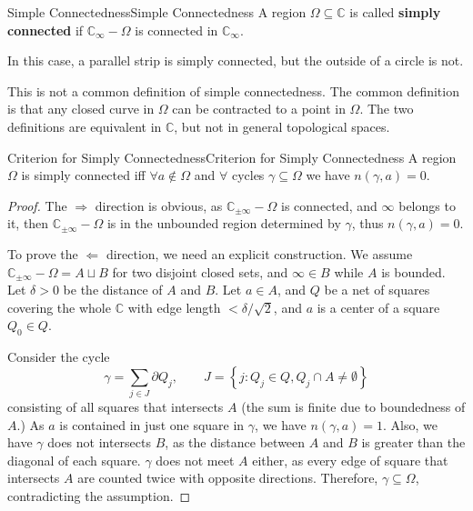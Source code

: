 \documentclass[../main.tex]{subfiles}
\begin{document}
\begin{definition}{Simple Connectedness}{Simple Connectedness}
	A region $\Omega \subseteq \mathbb{C}$ is called \textbf{simply connected} if $\mathbb{C}_{\infty }-\Omega$ is connected in $\mathbb{C}_{\infty }$.
\end{definition}
In this case, a parallel strip is simply connected, but the outside of a circle is not.
\begin{remark}
	This is not a common definition of simple connectedness. The common definition is that any closed curve in $\Omega$ can be contracted to a point in $\Omega$. The two definitions are equivalent in $\mathbb{C}$, but not in general topological spaces.
\end{remark}

\begin{theorem}{Criterion for Simply Connectedness}{Criterion for Simply Connectedness}
	A region $\Omega$ is simply connected iff $\forall a\notin \Omega$ and $\forall $ cycles $\gamma \subseteq \Omega$ we have $n(\gamma,a) = 0$.
\end{theorem}
\begin{proof}
	The $\Rightarrow$ direction is obvious, as $\mathbb{C}_{\pm \infty } - \Omega$ is connected, and $\infty$ belongs to it, then $\mathbb{C}_{\pm \infty }-\Omega$ is in the unbounded region determined by $\gamma$, thus $n(\gamma,a) = 0$.

	To prove the $\Leftarrow$ direction, we need an explicit construction. We assume $\mathbb{C}_{\pm \infty }-\Omega = A \sqcup B$ for two disjoint closed sets, and $\infty \in B$ while $A$ is bounded. Let $\delta>0$ be the distance of $A$ and $B$. Let $a\in A$, and $Q$ be a net of squares covering the whole $\mathbb{C}$ with edge length $< \delta / \sqrt{2}$, and $a$ is a center of a square $Q_0\in Q$.

	Consider the cycle
	\begin{equation}
	\gamma = \sum_{j\in J} \partial Q_j, \qquad J = \left\{ j:Q_j\in Q,Q_j\cap A \neq \emptyset \right\} 
	\end{equation}
	consisting of all squares that intersects $A$ (the sum is finite due to boundedness of $A$.) As $a$ is contained in just one square in $\gamma$, we have $n(\gamma,a)=1$. Also, we have  $\gamma$ does not intersects $B$, as the distance between $A$ and $B$ is greater than the diagonal of each square. $\gamma$ does not meet $A$ either, as every edge of square that intersects $A$ are counted twice with opposite directions. Therefore, $\gamma \subseteq \Omega$, contradicting the assumption.
\end{proof}
\end{document}
